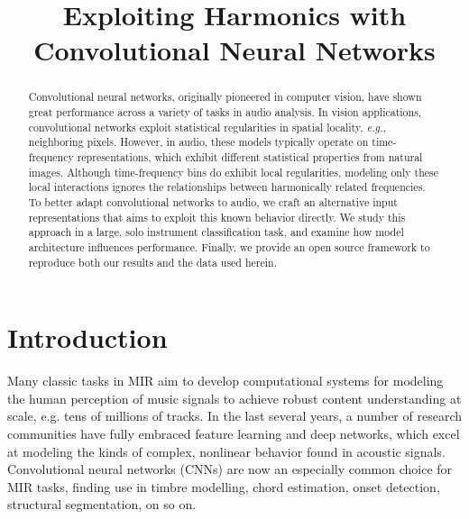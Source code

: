 \documentclass{article}
\title{Exploiting Harmonics with Convolutional Neural Networks}
\begin{document}
%
\maketitle
%
\begin{abstract}

Convolutional neural networks, originally pioneered in computer vision, have shown great performance across a variety of tasks in audio analysis.
In vision applications, convolutional networks exploit statistical regularities in spatial locality, \emph{e.g.}, neighboring pixels.
However, in audio, these models typically operate on time-frequency representations, which exhibit different statistical properties from natural images.
Although time-frequency bins do exhibit local regularities, modeling only these local interactions ignores the relationships between harmonically related frequencies.
To better adapt convolutional networks to audio, we craft an alternative input representations that aims to exploit this known behavior directly.
We study this approach in a large, solo instrument classification task, and examine how model architecture influences performance.
Finally, we provide an open source framework to reproduce both our results and the data used herein.
\end{abstract}


\section{Introduction}\label{sec:introduction}

Many classic tasks in MIR aim to develop computational systems for modeling the human perception of music signals to achieve robust content understanding at scale, e.g. tens of millions of tracks.
In the last several years, a number of research communities have fully embraced feature learning and deep networks, which excel at modeling the kinds of complex, nonlinear behavior found in acoustic signals.
Convolutional neural networks (CNNs) are now an especially common choice for MIR tasks, finding use in timbre modelling, chord estimation, onset detection, structural segmentation, on so on.
\end{document}
